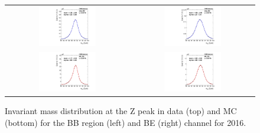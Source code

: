 \begin{figure}[ht]
  \begin{center}
    \begin{tabular}{cc}
      \includegraphics[width=0.48\textwidth]{figures/Zprime/2016/mass_resolution/h_mee_data_BB_2016_Moriond17.pdf} &
      \includegraphics[width=0.48\textwidth]{figures/Zprime/2016/mass_resolution/h_mee_data_BE_2016_Moriond17.pdf} \\
      \includegraphics[width=0.48\textwidth]{figures/Zprime/2016/mass_resolution/h_mee_MC_BB_2016_Moriond17.pdf} &
      \includegraphics[width=0.48\textwidth]{figures/Zprime/2016/mass_resolution/h_mee_MC_BE_2016_Moriond17.pdf}
    \end{tabular}
    \caption{Invariant mass distribution at the Z peak in data (top) and MC (bottom) for the BB region (left) and BE (right) channel for 2016.
    \label{fig:data_MC_peak_2016}}
  \end{center}
\end{figure}

